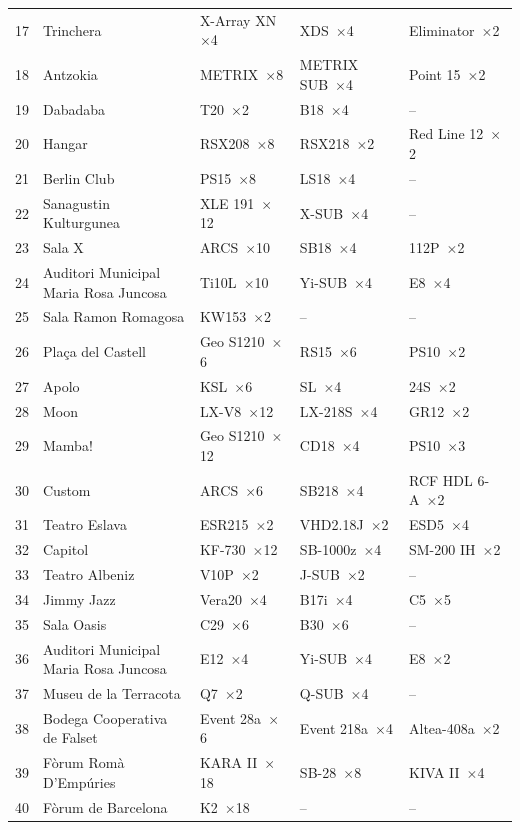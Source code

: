 \begin{longtable}{@{}r p{2.9cm} p{2.9cm} p{2.6cm} p{1.9cm}@{}}
17 & Trinchera & X-Array XN~$\times$4 & XDS~$\times$4 & Eliminator~$\times$2 \\
18 & Antzokia & METRIX~$\times$8 & METRIX SUB~$\times$4 & Point 15~$\times$2 \\
19 & Dabadaba & T20~$\times$2 & B18~$\times$4 & -- \\
20 & Hangar & RSX208~$\times$8 & RSX218~$\times$2 & Red Line 12~$\times$2 \\
21 & Berlin Club & PS15~$\times$8 & LS18~$\times$4 & -- \\
22 & Sanagustin Kulturgunea & XLE 191~$\times$12 & X-SUB~$\times$4 & -- \\
23 & Sala X & ARCS~$\times$10 & SB18~$\times$4 & 112P~$\times$2 \\
24 & Auditori Municipal Maria Rosa Juncosa & Ti10L~$\times$10 & Yi-SUB~$\times$4 & E8~$\times$4 \\
25 & Sala Ramon Romagosa & KW153~$\times$2 & -- & -- \\
26 & Plaça del Castell & Geo S1210~$\times$6 & RS15~$\times$6 & PS10~$\times$2 \\
27 & Apolo & KSL~$\times$6 & SL~$\times$4 & 24S~$\times$2 \\
28 & Moon & LX-V8~$\times$12 & LX-218S~$\times$4 & GR12~$\times$2 \\
29 & Mamba! & Geo S1210~$\times$12 & CD18~$\times$4 & PS10~$\times$3 \\
30 & Custom & ARCS~$\times$6 & SB218~$\times$4 & RCF HDL 6-A~$\times$2 \\
31 & Teatro Eslava & ESR215~$\times$2 & VHD2.18J~$\times$2 & ESD5~$\times$4 \\
32 & Capitol & KF-730~$\times$12 & SB-1000z~$\times$4 & SM-200 IH~$\times$2 \\
33 & Teatro Albeniz & V10P~$\times$2 & J-SUB~$\times$2 & -- \\
34 & Jimmy Jazz & Vera20~$\times$4 & B17i~$\times$4 & C5~$\times$5 \\
35 & Sala Oasis & C29~$\times$6 & B30~$\times$6 & -- \\
36 & Auditori Municipal Maria Rosa Juncosa & E12~$\times$4 & Yi-SUB~$\times$4 & E8~$\times$2 \\
37 & Museu de la Terracota & Q7~$\times$2 & Q-SUB~$\times$4 & -- \\
38 & Bodega Cooperativa de Falset & Event 28a~$\times$6 & Event 218a~$\times$4 & Altea-408a~$\times$2 \\
39 & Fòrum Romà D'Empúries & KARA II~$\times$18 & SB-28~$\times$8 & KIVA II~$\times$4 \\
40 & Fòrum de Barcelona & K2~$\times$18 & -- & -- \\
\end{longtable}
